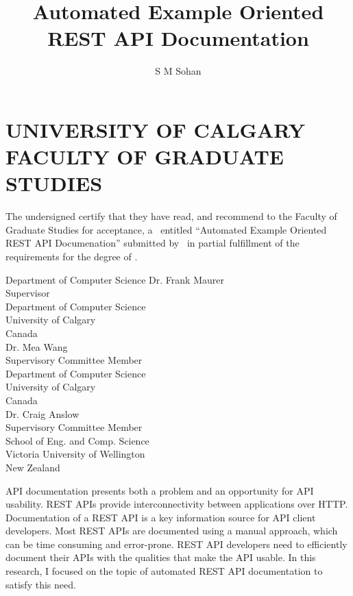 \documentclass[12pt]{ucalgthes1}
\title{Automated Example Oriented REST API Documentation}
\author{S M Sohan}
\newcommand{\thesistitle}{Automated Example Oriented REST API Documenation}
\begin{document}
\makethesistitle
{}     %
\setcounter{page}{2}
\chapter*{UNIVERSITY OF CALGARY \\ FACULTY OF GRADUATE STUDIES}
\thispagestyle{empty}
The undersigned certify that they have read, and recommend
to the Faculty of Graduate Studies for acceptance, a \Thesis\ entitled
``\thesistitle'' submitted by \Author\
in partial fulfillment of the requirements for the degree of
\Degree.\\

%
%
\begin{signing}{Department of Computer Science}
\signline
Dr. Frank Maurer \\
Supervisor\\
Department of Computer Science \\
University of Calgary \\
Canada\\
\signline
Dr. Mea Wang\\
Supervisory Committee Member\\
Department of Computer Science \\
University of Calgary \\
Canada\\
\signline
Dr. Craig Anslow\\
Supervisory Committee Member\\
School of Eng. and Comp. Science \\
Victoria University of Wellington\\
New Zealand\\
\end{signing}
%
\newpage
{}
{}
API documentation presents both a problem and an opportunity for API usability. REST APIs provide interconnectivity between applications over HTTP. Documentation of a REST API is a key information source for API client developers. Most REST APIs are documented using a manual approach, which can be time consuming and error-prone. REST API developers need to efficiently document their APIs with the qualities that make the API usable. In this research, I focused on the topic of automated REST API documentation to satisfy this need.
\end{document}
